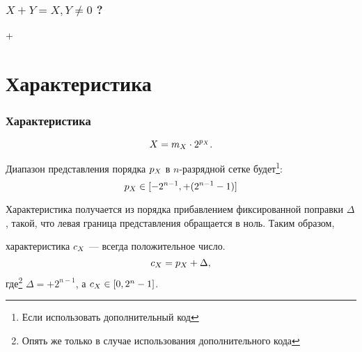 \begin{frame}
    \frametitle{$X+Y=X, Y\neq 0$ ?}

    \begin{center}
         +
    \end{center}
    
    
    \begin{center}
    \end{center}
\end{frame}

    
\section{Характеристика}


\begin{frame}
    \frametitle{Характеристика}

    \[
        X = m_{X}\cdot {2}^{p_{X}}.
    \]
    
    Диапазон представления порядка $p_{X}$ в $n$-разрядной сетке будет\footnote{Если использовать дополнительный код}:
    \[
        p_{X}\in[-2^{n-1}, +(2^{n-1}-1)]
    \]
    
    Характеристика получается из порядка прибавлением фиксированной поправки $\Delta$, такой, что левая граница представления обращается в ноль. Таким образом, 
    \begin{block}{}
        характеристика $c_{X}$ --- всегда положительное число.
        \begin{equation}
            c_{X} = p_{X} + \Delta,
            \label{add:fpt:char}
        \end{equation}
        где\footnote{Опять же только в случае использования дополнительного кода} $\Delta=+2^{n-1}$, а $c_{X}\in[0,2^n-1]$.
    \end{block}
\end{frame}

